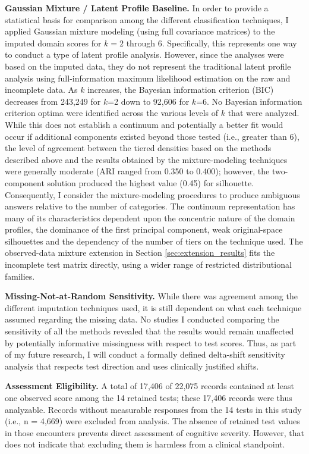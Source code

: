 \textbf{Gaussian Mixture / Latent Profile Baseline.} In order to provide a statistical basis for comparison among the different classification techniques, I applied Gaussian mixture modeling (using full covariance matrices) to the imputed domain scores for \(k = 2\) through 6. Specifically, this represents one way to conduct a type of latent profile analysis. However, since the analyses were based on the imputed data, they do not represent the traditional latent profile analysis using full-information maximum likelihood estimation on the raw and incomplete data. As \(k\) increases, the Bayesian information criterion (BIC) decreases from 243,249 for \(k\)=2 down to 92,606 for \(k\)=6. No Bayesian information criterion optima were identified across the various levels of \(k\) that were analyzed. While this does not establish a continuum and potentially a better fit would occur if additional components existed beyond those tested (i.e., greater than 6), the level of agreement between the tiered densities based on the methods described above and the results obtained by the mixture-modeling techniques were generally moderate (ARI ranged from 0.350 to 0.400); however, the two-component solution produced the highest value (0.45) for silhouette. Consequently, I consider the mixture-modeling procedures to produce ambiguous answers relative to the number of categories. The continuum representation has many of its characteristics dependent upon the concentric nature of the domain profiles, the dominance of the first principal component, weak original-space silhouettes and the dependency of the number of tiers on the technique used. The observed-data mixture extension in Section \ref{sec:extension_results} fits the incomplete test matrix directly, using a wider range of restricted distributional families.

\textbf{Missing-Not-at-Random Sensitivity.} While there was agreement among the different imputation techniques used, it is still dependent on what each technique assumed regarding the missing data. No studies I conducted comparing the sensitivity of all the methods revealed that the results would remain unaffected by potentially informative missingness with respect to test scores. Thus, as part of my future research, I will conduct a formally defined delta-shift sensitivity analysis that respects test direction and uses clinically justified shifts.

\textbf{Assessment Eligibility.} A total of 17,406 of 22,075 records contained at least one observed score among the 14 retained tests; these 17,406 records were thus analyzable. Records without measurable responses from the 14 tests in this study (i.e., n = 4,669) were excluded from analysis. The absence of retained test values in those encounters prevents direct assessment of cognitive severity. However, that does not indicate that excluding them is harmless from a clinical standpoint.

